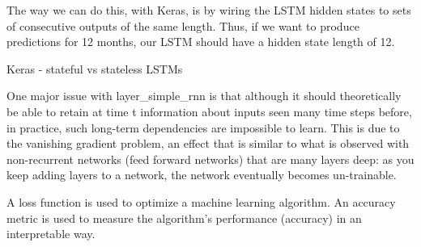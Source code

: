 \documentclass[]{book}
\newenvironment{Shaded}{\begin{snugshade}}{\end{snugshade}}
\newcommand{\KeywordTok}[1]{\textcolor[rgb]{0.13,0.29,0.53}{\textbf{#1}}}
\newcommand{\DataTypeTok}[1]{\textcolor[rgb]{0.13,0.29,0.53}{#1}}
\newcommand{\DecValTok}[1]{\textcolor[rgb]{0.00,0.00,0.81}{#1}}
\newcommand{\StringTok}[1]{\textcolor[rgb]{0.31,0.60,0.02}{#1}}
\newcommand{\OperatorTok}[1]{\textcolor[rgb]{0.81,0.36,0.00}{\textbf{#1}}}
\newcommand{\NormalTok}[1]{#1}
\begin{document}
The way we can do this, with Keras, is by wiring the LSTM hidden states
to sets of consecutive outputs of the same length. Thus, if we want to
produce predictions for 12 months, our LSTM should have a hidden state
length of 12.

Keras - stateful vs stateless LSTMs

One major issue with layer\_simple\_rnn is that although it should
theoretically be able to retain at time t information about inputs seen
many time steps before, in practice, such long-term dependencies are
impossible to learn. This is due to the vanishing gradient problem, an
effect that is similar to what is observed with non-recurrent networks
(feed forward networks) that are many layers deep: as you keep adding
layers to a network, the network eventually becomes un-trainable.

A loss function is used to optimize a machine learning algorithm. An
accuracy metric is used to measure the algorithm's performance
(accuracy) in an interpretable way.

\begin{Shaded}
\end{Shaded}
\end{document}
